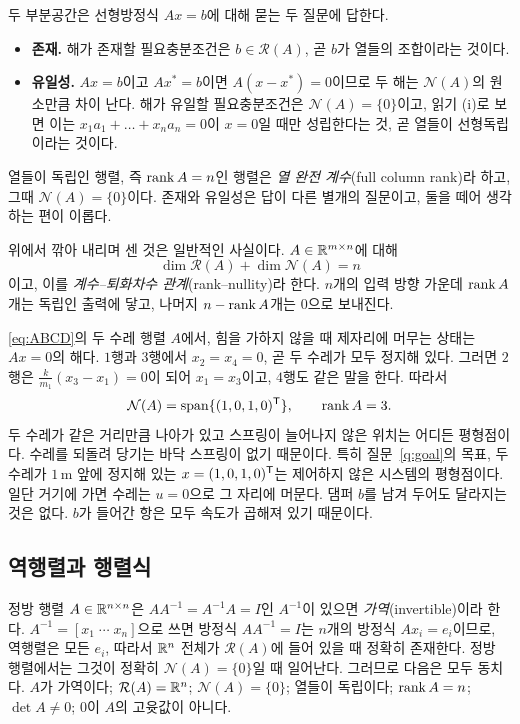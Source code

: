 \documentclass[11pt]{article}
\begin{document}
두 부분공간은 선형방정식 $Ax=b$에 대해 묻는 두 질문에 답한다.
\begin{itemize}[leftmargin=*,itemsep=2pt]
\item \textbf{존재.} 해가 존재할 필요충분조건은 $b\in\mathcal R(A)$, 곧 $b$가
열들의 조합이라는 것이다.
\item \textbf{유일성.} $Ax=b$이고 $Ax^{*}=b$이면 $A(x-x^{*})=0$이므로 두 해는
$\mathcal N(A)$의 원소만큼 차이 난다. 해가 유일할 필요충분조건은
$\mathcal N(A)=\{0\}$이고, 읽기 (i)로 보면 이는 $x_1a_1+\dots+x_na_n=0$이 $x=0$일
때만 성립한다는 것, 곧 열들이 선형독립이라는 것이다.
\end{itemize}
열들이 독립인 행렬, 즉 $\operatorname{rank} A=n$인 행렬은 \emph{열 완전 계수}(full column
rank)라 하고, 그때 $\mathcal N(A)=\{0\}$이다. 존재와 유일성은 답이 다른 별개의
질문이고, 둘을 떼어 생각하는 편이 이롭다.

\begin{remark}[차원 세기]
위에서 깎아 내리며 센 것은 일반적인 사실이다. $A\in\mathbb{R}^{m\times n}$에 대해
\[
   \dim\mathcal R(A)+\dim\mathcal N(A) = n
\]
이고, 이를 \emph{계수--퇴화차수 관계}(rank--nullity)라 한다. $n$개의 입력 방향 가운데
$\operatorname{rank} A$개는 독립인 출력에 닿고, 나머지 $n-\operatorname{rank} A$개는 $0$으로 보내진다.
\end{remark}

\begin{example}\label{ex:cartnull}
\eqref{eq:ABCD}의 두 수레 행렬 $A$에서, 힘을 가하지 않을 때 제자리에 머무는 상태는
$Ax=0$의 해다. $1$행과 $3$행에서 $x_2=x_4=0$, 곧 두 수레가 모두 정지해 있다. 그러면
$2$행은 $\frac{k}{m_1}(x_3-x_1)=0$이 되어 $x_1=x_3$이고, $4$행도 같은 말을 한다. 따라서
\[
   \mathcal N(A) = \operatorname{span}\{(1,0,1,0)^{\mathsf{T}}\},
   \qquad \operatorname{rank} A = 3 .
\]
두 수레가 같은 거리만큼 나아가 있고 스프링이 늘어나지 않은 위치는 어디든 평형점이다.
수레를 되돌려 당기는 바닥 스프링이 없기 때문이다. 특히 질문~\ref{q:goal}의 목표,
두 수레가 $1$\,m 앞에 정지해 있는 $x=(1,0,1,0)^{\mathsf{T}}$는 제어하지 않은 시스템의
평형점이다. 일단 거기에 가면 수레는 $u=0$으로 그 자리에 머문다. 댐퍼 $b$를 남겨
두어도 달라지는 것은 없다. $b$가 들어간 항은 모두 속도가 곱해져 있기 때문이다.
\end{example}

\subsection{역행렬과 행렬식}
정방 행렬 $A\in\mathbb{R}^{n\times n}$은 $AA^{-1}=A^{-1}A=I$인 $A^{-1}$이 있으면
\emph{가역}(invertible)이라 한다. $A^{-1}=[x_1\;\cdots\;x_n]$으로 쓰면 방정식
$AA^{-1}=I$는 $n$개의 방정식 $Ax_i=e_i$이므로, 역행렬은 모든 $e_i$, 따라서
$\mathbb{R}^{n}$ 전체가 $\mathcal R(A)$에 들어 있을 때 정확히 존재한다. 정방 행렬에서는
그것이 정확히 $\mathcal N(A)=\{0\}$일 때 일어난다. 그러므로 다음은 모두 동치다.
$A$가 가역이다; $\mathcal R(A)=\mathbb{R}^{n}$; $\mathcal N(A)=\{0\}$; 열들이 독립이다;
$\operatorname{rank} A=n$; $\det A\neq0$; $0$이 $A$의 고윳값이 아니다.
\end{document}
